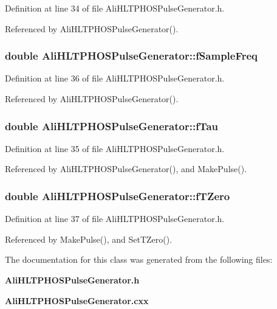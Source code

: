 Definition at line 34 of file Ali\-HLTPHOSPulse\-Generator.h.

Referenced by Ali\-HLTPHOSPulse\-Generator().
\subsubsection{\setlength{\rightskip}{0pt plus 5cm}double {\bf Ali\-HLTPHOSPulse\-Generator::f\-Sample\-Freq}\hspace{0.3cm}{\tt  [private]}}\label{classAliHLTPHOSPulseGenerator_r3}




Definition at line 36 of file Ali\-HLTPHOSPulse\-Generator.h.

Referenced by Ali\-HLTPHOSPulse\-Generator().
\subsubsection{\setlength{\rightskip}{0pt plus 5cm}double {\bf Ali\-HLTPHOSPulse\-Generator::f\-Tau}\hspace{0.3cm}{\tt  [private]}}\label{classAliHLTPHOSPulseGenerator_r2}




Definition at line 35 of file Ali\-HLTPHOSPulse\-Generator.h.

Referenced by Ali\-HLTPHOSPulse\-Generator(), and Make\-Pulse().
\subsubsection{\setlength{\rightskip}{0pt plus 5cm}double {\bf Ali\-HLTPHOSPulse\-Generator::f\-TZero}\hspace{0.3cm}{\tt  [private]}}\label{classAliHLTPHOSPulseGenerator_r4}




Definition at line 37 of file Ali\-HLTPHOSPulse\-Generator.h.

Referenced by Make\-Pulse(), and Set\-TZero().

The documentation for this class was generated from the following files:\begin{CompactItemize}
\item 
{\bf Ali\-HLTPHOSPulse\-Generator.h}\item 
{\bf Ali\-HLTPHOSPulse\-Generator.cxx}\end{CompactItemize}
